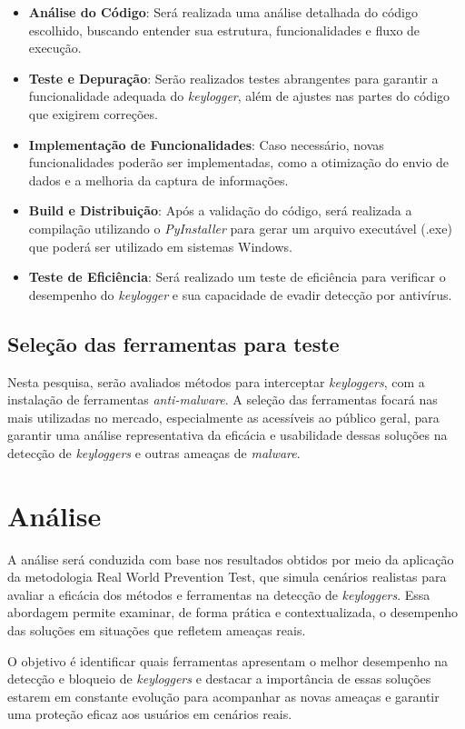 \documentclass[12pt]{article}
\begin{document}
\begin{itemize}
    \item \textbf{Análise do Código}: Será realizada uma análise detalhada do código escolhido, buscando entender sua estrutura, funcionalidades e fluxo de execução.
    \item \textbf{Teste e Depuração}: Serão realizados testes abrangentes para garantir a funcionalidade adequada do \textit{keylogger}, além de ajustes nas partes do código que exigirem correções.
    \item \textbf{Implementação de Funcionalidades}: Caso necessário, novas funcionalidades poderão ser implementadas, como a otimização do envio de dados e a melhoria da captura de informações.
    \item \textbf{Build e Distribuição}: Após a validação do código, será realizada a compilação utilizando o \textit{PyInstaller} para gerar um arquivo executável (.exe) que poderá ser utilizado em sistemas Windows.
    \item \textbf{Teste de Eficiência}: Será realizado um teste de eficiência para verificar o desempenho do \textit{keylogger} e sua capacidade de evadir detecção por antivírus.
\end{itemize}

\subsection{Seleção das ferramentas para teste}
Nesta pesquisa, serão avaliados métodos para interceptar \textit{keyloggers}, com a instalação de ferramentas \textit{anti-malware}. A seleção das ferramentas focará nas mais utilizadas no mercado, especialmente as acessíveis ao público geral, para garantir uma análise representativa da eficácia e usabilidade dessas soluções na detecção de \textit{keyloggers} e outras ameaças de \textit{malware}.

\section{Análise}
A análise será conduzida com base nos resultados obtidos por meio da aplicação da metodologia Real World Prevention Test, que simula cenários realistas para avaliar a eficácia dos métodos e ferramentas na detecção de \textit{keyloggers}. Essa abordagem permite examinar, de forma prática e contextualizada, o desempenho das soluções em situações que refletem ameaças reais.

O objetivo é identificar quais ferramentas apresentam o melhor desempenho na detecção e bloqueio de \textit{keyloggers} e destacar a importância de essas soluções estarem em constante evolução para acompanhar as novas ameaças e garantir uma proteção eficaz aos usuários em cenários reais.
\end{document}
